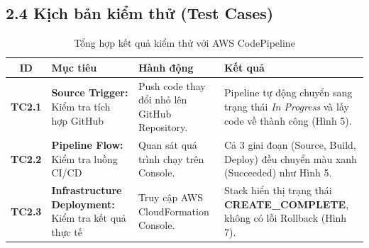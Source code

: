 \documentclass[12pt,a4paper]{article}
\begin{document}
\subsection*{2.4 Kịch bản kiểm thử (Test Cases)}
\begin{table}[H]
    \centering
    \small
    \begin{tabular}{|c|p{4cm}|p{5cm}|p{4cm}|}
        \hline
        \rowcolor{gray!20} \textbf{ID} & \textbf{Mục tiêu} & \textbf{Hành động} & \textbf{Kết quả} \\ \hline
        \textbf{TC2.1} & \textbf{Source Trigger:} Kiểm tra tích hợp GitHub & Push code thay đổi nhỏ lên GitHub Repository. & Pipeline tự động chuyển sang trạng thái \textit{In Progress} và lấy code về thành công (Hình 5). \\ \hline
        \textbf{TC2.2} & \textbf{Pipeline Flow:} Kiểm tra luồng CI/CD & Quan sát quá trình chạy trên Console. & Cả 3 giai đoạn (Source, Build, Deploy) đều chuyển màu xanh (Succeeded) như Hình 5. \\ \hline
        \textbf{TC2.3} & \textbf{Infrastructure Deployment:} Kiểm tra kết quả thực tế & Truy cập AWS CloudFormation Console. & Stack hiển thị trạng thái \textbf{CREATE\_COMPLETE}, không có lỗi Rollback (Hình 7). \\ \hline
    \end{tabular}
    \caption{Tổng hợp kết quả kiểm thử với AWS CodePipeline}
\end{table}

\end{document}
